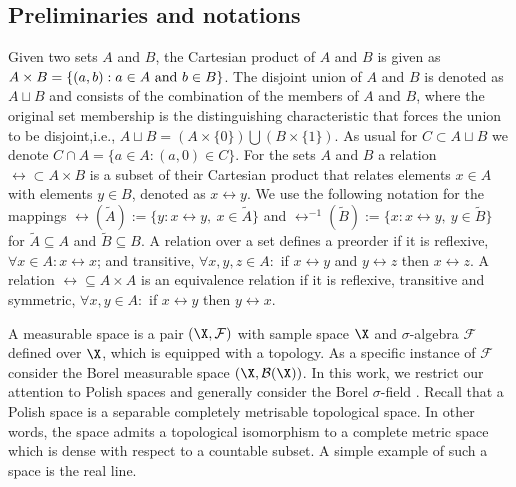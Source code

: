 \documentclass[letterpaper, 10 pt, conference]{amsart}
\theoremstyle{definition}
\theoremstyle{example}
\theoremstyle{remark}
\begin{document}
\subsection{Preliminaries and notations} 
Given two sets $A$ and $B$,  the Cartesian product of $A$ and $B$ is given as $A\times B=\{(a,b): a\in A \textmd{ and } b \in B\}$. 
The disjoint union of $A$ and $B$ is denoted as $A\sqcup B$ and consists of the combination of the members of $A$ and $B$, where the original set membership is the distinguishing characteristic that forces the union to be disjoint,i.e., \(A\sqcup B=(A\times \{0\})\bigcup (B\times \{1\}).\) As usual for $C\subset A\sqcup B$ we denote $C\cap A=\{a\in A: (a,0) \in C\}$.
For the sets $A$ and $B$ a relation $\rel\subset A\times B$ is a subset of their Cartesian product that relates elements $x\in A$ with elements $y\in B$, denoted as $x\rel y$.
We use the following notation for the mappings $\rel(\tilde A):=\{y: x\rel y,\  x\in \tilde A\}$ and $\rel^{-1}(\tilde B):=\{x: x\rel y,\  y\in \tilde B\}$  for $\tilde A\subseteq A$ and $\tilde B\subseteq B$.
A relation over a set defines a preorder if it is reflexive, $\forall x\in A: x\rel x$; and transitive, $\forall x,y,z\in A:$ if $x \rel y $ and $y \rel z$ then $x\rel z$. A relation $\rel\subseteq A\times A$ is an equivalence relation if it is reflexive, transitive and symmetric, $\forall x,y\in A:$ if $x \rel y $ then $y\rel x$.
 
A measurable space is a pair $(\X,\mathcal{ F})$ with sample space $\X$ and $\sigma$-algebra $\mathcal{F}$ defined over $\X$, 
which is equipped with a topology.    
As a specific instance of $\mathcal F$ consider the Borel measurable space $(\X,\mathcal{B}(\X))$. 
In this work, we restrict our attention to Polish spaces and generally consider the Borel $\sigma$-field \cite{bogachev2007measure}. 
Recall that a Polish space is a separable completely metrisable topological space. 
In other words, 
the space admits a topological isomorphism to a complete metric space which is dense with respect to a countable subset. 
A simple example of such a space is the real line.  
\end{document}

